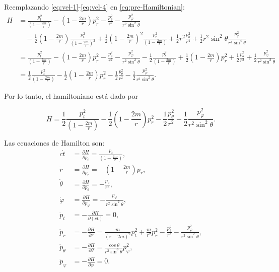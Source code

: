\documentclass[letterpaper,11pt]{article}
\begin{document}
Reemplazando \eqref{eq:vel-1}-\eqref{eq:vel-4} en \eqref{eq:pre-Hamiltonian}:
\begin{align}
H &= \frac{p_t^2}{\left(1 -\frac{2m}{r} \right)} - \left(1 -\frac{2m}{r} \right) p_r^2 - \frac{p_{\theta}^2}{r^2} - \frac{p_{\varphi}^2}{r^2\sin^2\theta} \nonumber \\
&\quad - \frac{1}{2} \left( 1 - \frac{2m}{r}\right)\frac{p_t^2}{\left( 1 - \frac{2m}{r}\right)^2} + \frac{1}{2}\left( 1 - \frac{2m}{r}\right)^2 \frac{p_r^2}{\left( 1 - \frac{2m}{r}\right) }  + \frac{1}{2} r^2 \frac{p_{\theta}^2}{r^4} + \frac{1}{2} r^2\sin^2\theta \frac{p_{\varphi}^2}{r^4\sin^4\theta} \nonumber \\
&= \frac{p_t^2}{\left(1 -\frac{2m}{r} \right)} - \left(1 -\frac{2m}{r} \right) p_r^2 - \frac{p_{\theta}^2}{r^2} - \frac{p_{\varphi}^2}{r^2\sin^2\theta} - \frac{1}{2}\frac{p_t^2}{\left( 1 - \frac{2m}{r}\right)} + \frac{1}{2}\left( 1 - \frac{2m}{r}\right) p_r^2  + \frac{1}{2}  \frac{p_{\theta}^2}{r^2} + \frac{1}{2} \frac{p_{\varphi}^2}{r^2\sin^2\theta} \nonumber \\
&= \frac{1}{2}\frac{p_t^2}{\left(1 -\frac{2m}{r} \right)} - \frac{1}{2} \left(1 -\frac{2m}{r} \right) p_r^2 - \frac{1}{2}\frac{p_{\theta}^2}{r^2} - \frac{1}{2} \frac{p_{\varphi}^2}{r^2\sin^2\theta}.
\end{align}

Por lo tanto, el hamiltoniano está dado por
\begin{shaded}
\begin{equation}
H = \frac{1}{2}\frac{p_t^2}{\left(1 -\frac{2m}{r} \right)} - \frac{1}{2} \left(1 -\frac{2m}{r} \right) p_r^2 - \frac{1}{2}\frac{p_{\theta}^2}{r^2} - \frac{1}{2} \frac{p_{\varphi}^2}{r^2\sin^2\theta}.
\end{equation}
\end{shaded}

Las ecuaciones de Hamilton son:
\begin{align}
c \dot{t} &= \frac{\partial H}{\partial p_t} = \frac{p_t}{\left( 1 - \frac{2m}{r}\right)}, \label{eq:Hamilton-1} \\
\dot{r} &= \frac{\partial H}{\partial p_r} = -  \left(1 -\frac{2m}{r} \right) p_r \label{eq:Hamilton-2}, \\
\dot{\theta} &= \frac{\partial H}{\partial p_{\theta}} = - \frac{p_{\theta}}{r^2} \label{eq:Hamilton-3}, \\
\dot{\varphi} &= \frac{\partial H}{\partial p_{\varphi}} = - \frac{p_{\varphi}}{r^2\sin^2\theta}, \label{eq:Hamilton-4}\\
\dot{p}_t &= - \frac{\partial H}{\partial (ct)} = 0, \label{eq:Hamilton-5}\\
\dot{p}_r &= - \frac{\partial H}{\partial r} = \frac{m}{(r - 2m)^2} p_t^2 + \frac{m}{r^2} p_r^2 - \frac{p_{\theta}^2}{r^3} - \frac{p_{\varphi}^2}{r^3\sin^2\theta}, \label{eq:Hamilton-6} \\
\dot{p}_{\theta} &= - \frac{\partial H}{\partial \theta} =  \frac{\cos\theta }{r^2 \sin^3\theta} p_{\varphi}^2,  \label{eq:Hamilton-7} \\
\dot{p}_{\varphi} &= - \frac{\partial H}{\partial \varphi} = 0. \label{eq:Hamilton-8}
\end{align}
\end{document}
